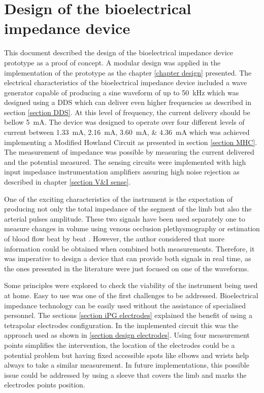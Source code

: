 \section{Design of the bioelectrical impedance device}
This document described the design of the bioelectrical impedance device prototype as a proof of concept. A modular design was applied in the implementation of the prototype as the chapter \ref{chapter design} presented. The electrical characteristics of the bioelectrical impedance device included a wave generator capable of producing a sine waveform of up to \SI{50}{\kHz} which was designed using a DDS which can deliver even higher frequencies as described in section \ref{section DDS}. At this level of frequency, the current delivery should be bellow \SI{5}{\mA}. The device was designed to operate over four different levels of current between \SIlist{1.33;2.16;3.60;4.36}{\mA} which was achieved implementing a Modified Howland Circuit as presented in section \ref{section MHC}. The measurement of impedance was possible by measuring the current delivered and the potential measured. The sensing circuits were implemented with high input impedance instrumentation amplifiers assuring high noise rejection as described in chapter \ref{section V&I sense}. 

One of the exciting characteristics of the instrument is the expectation of producing not only the total impedance of the segment of the limb but also the arterial pulses amplitude. These two signals have been used separately one to measure changes in volume using venous occlusion plethysmography \cite{mohapatra1979measurement, costeloe1980continuous, yamakoshi1980limb} or estimation of blood flow beat by beat  \cite{corciova2011peripheral, porter1985measurement, brown1975impedance, marks1985computer}. However, the author considered that more information could be obtained when combined both measurements. Therefore, it was imperative to design a device that can provide both signals in real time, as the ones presented in the literature were just focused on one of the waveforms. 

Some principles were explored to check the viability of the instrument being used at home. Easy to use was one of the first challenges to be addressed. Bioelectrical impedance technology can be easily used without the assistance of specialised personnel. The sections \ref{section iPG electrodes} explained the benefit of using a tetrapolar electrodes configuration. In the implemented circuit this was the approach used as shown in \ref{section design electrodes}. Using four measurement points simplifies the intervention, the location of the electrodes could be a potential problem but having fixed accessible spots like elbows and wrists help always to take a similar measurement. In future implementations, this possible issue could be addressed by using a sleeve that covers the limb and marks the electrodes points position. 

